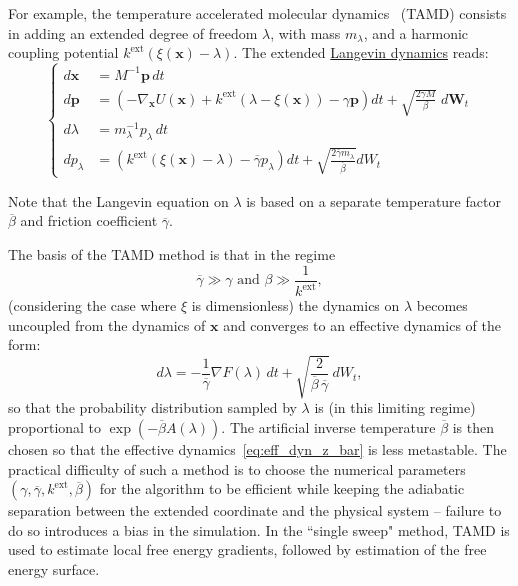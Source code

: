 \documentclass[9pt,review]{livecoms}
\newcommand{\vx}{\mathbf{x}}
\newcommand{\vp}{\mathbf{p}}
\begin{document}
For example, the temperature accelerated molecular dynamics~\cite{MV06} (TAMD) consists in adding an extended degree of freedom $\lambda$, with mass $m_\lambda$, and a harmonic coupling potential $k^\mathrm{ext} \left( \xi(\vx) - \lambda \right)$.
The extended \hyperlink{ref:Langevin} {Langevin dynamics} reads:
\begin{equation}
\left\{
\begin{array}{ll}
    d\vx &= M^{-1} \vp \,  dt \\
    d\vp &= \left(-\nabla_\vx U(\vx) + k^\mathrm{ext} ( \lambda -\xi(\vx)) - \gamma \vp \right) dt
    + \sqrt{ \frac{2 \gamma M}{\beta}} \; d\mathbf{W}_t \\
    d\lambda &= m_\lambda^{-1} p_\lambda \, dt\\
    d p_\lambda &= \left( k^\mathrm{ext} (\xi(\vx) - \lambda)  - \overline\gamma p_\lambda \right) dt
    + \sqrt{ \frac{2 \bar\gamma m_\lambda}{ \overline\beta}} dW_t
\end{array}
\right.
\end{equation}

Note that the Langevin equation on $\lambda$ is based on a separate temperature factor $\overline \beta$ and friction coefficient $\overline{\gamma}$.

The basis of the TAMD method is that in the regime
\begin{equation}
\overline{\gamma} \gg \gamma \text{ and }\beta \gg \frac{1}{k^\mathrm{ext}},
\end{equation}
(considering the case where $\xi$ is dimensionless) the dynamics on $\lambda$ becomes uncoupled from the dynamics of $\vx$ and converges to an effective dynamics of the form:
\begin{equation}\label{eq:eff_dyn_z_bar}
d\lambda = - \frac{1}{\overline{\gamma}} \nabla F (\lambda) \, dt + \sqrt{ \frac{2}{\overline{\beta} \, \overline{\gamma}}} \, dW_t,
\end{equation}
so that the probability distribution sampled by $\lambda$ is (in this limiting regime) proportional to $\exp(- \overline{\beta} A(\lambda))$. The artificial inverse temperature $\overline{\beta}$ is then chosen so that the effective dynamics~\eqref{eq:eff_dyn_z_bar} is less metastable.
The practical difficulty of such a method is to choose the numerical parameters $(\gamma,\overline{\gamma},k^\mathrm{ext},\overline{\beta})$ for the algorithm to be efficient while keeping the adiabatic separation between the extended coordinate and the physical system -- failure to do so introduces a bias in the simulation.
In the ``single sweep" method, TAMD is used to estimate local free energy gradients, followed by estimation of the free energy surface.\cite{Maragliano2008}
\end{document}
